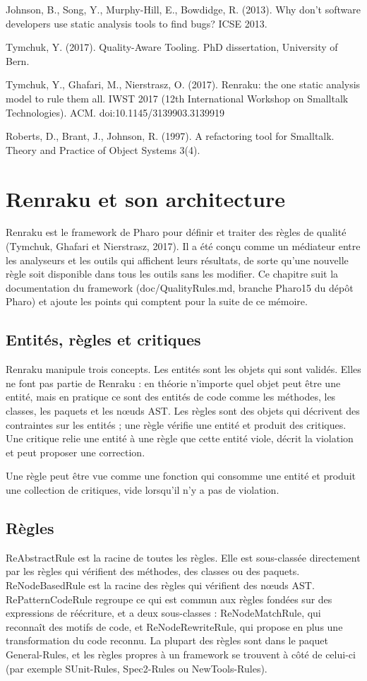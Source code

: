 \documentclass[11pt,a4paper]{report}
\begin{document}
Johnson, B., Song, Y., Murphy-Hill, E., Bowdidge, R. (2013). Why don't software developers use static analysis tools to find bugs? ICSE 2013.

Tymchuk, Y. (2017). Quality-Aware Tooling. PhD dissertation, University of Bern.

Tymchuk, Y., Ghafari, M., Nierstrasz, O. (2017). Renraku: the one static analysis model to rule them all. IWST 2017 (12th International Workshop on Smalltalk Technologies). ACM. doi:10.1145/3139903.3139919

Roberts, D., Brant, J., Johnson, R. (1997). A refactoring tool for Smalltalk. Theory and Practice of Object Systems 3(4).

\chapter{Renraku et son architecture}
Renraku est le framework de Pharo pour définir et traiter des règles de qualité (Tymchuk, Ghafari et Nierstrasz, 2017). Il a été conçu comme un médiateur entre les analyseurs et les outils qui affichent leurs résultats, de sorte qu’une nouvelle règle soit disponible dans tous les outils sans les modifier. Ce chapitre suit la documentation du framework (doc/QualityRules.md, branche Pharo15 du dépôt Pharo) et ajoute les points qui comptent pour la suite de ce mémoire.

\section{Entités, règles et critiques}
Renraku manipule trois concepts. Les entités sont les objets qui sont validés. Elles ne font pas partie de Renraku : en théorie n’importe quel objet peut être une entité, mais en pratique ce sont des entités de code comme les méthodes, les classes, les paquets et les nœuds AST. Les règles sont des objets qui décrivent des contraintes sur les entités ; une règle vérifie une entité et produit des critiques. Une critique relie une entité à une règle que cette entité viole, décrit la violation et peut proposer une correction.

Une règle peut être vue comme une fonction qui consomme une entité et produit une collection de critiques, vide lorsqu’il n’y a pas de violation.

\section{Règles}
ReAbstractRule est la racine de toutes les règles. Elle est sous-classée directement par les règles qui vérifient des méthodes, des classes ou des paquets. ReNodeBasedRule est la racine des règles qui vérifient des nœuds AST. RePatternCodeRule regroupe ce qui est commun aux règles fondées sur des expressions de réécriture, et a deux sous-classes : ReNodeMatchRule, qui reconnaît des motifs de code, et ReNodeRewriteRule, qui propose en plus une transformation du code reconnu. La plupart des règles sont dans le paquet General-Rules, et les règles propres à un framework se trouvent à côté de celui-ci (par exemple SUnit-Rules, Spec2-Rules ou NewTools-Rules).
\end{document}
